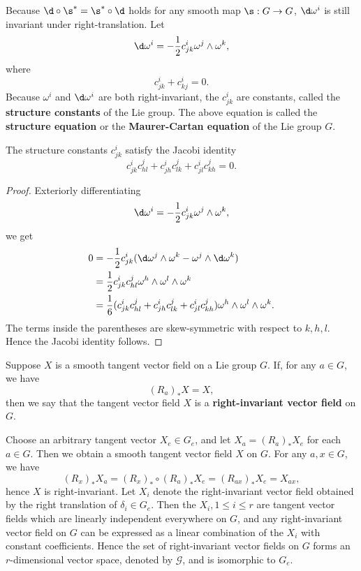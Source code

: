 \documentclass[11pt]{article}
\begin{document}
Because $\d \circ \s^* = \s^* \circ \d$ holds for any smooth map $\s : G \rightarrow G$, $\d\omega^i$ is still invariant under right-translation. Let $$\d\omega^i = -\frac{1}{2}c^i_{jk}\omega^j \wedge \omega^k,$$ where $$c^i_{jk} + c^i_{kj} = 0.$$ Because $\omega^i$ and $\d\omega^i$ are both right-invariant, the $c^i_{jk}$ are constants, called the \textbf{structure constants} of the Lie group. The above equation is called the \textbf{structure equation} or the \textbf{Maurer-Cartan equation} of the Lie group $G$. 

\begin{theorem}
    The structure constants $c^i_{jk}$ satisfy the Jacobi identity $$c^i_{jk}c^j_{hl} + c^i_{jh}c^j_{lk} + c^i_{jl}c^j_{kh} = 0.$$
\end{theorem}
\begin{proof}
    Exteriorly differentiating $$\d\omega^i = -\frac{1}{2}c^i_{jk}\omega^j \wedge \omega^k,$$ we get
    \begin{align*}
        0 &= -\frac{1}{2}c^i_{jk}(\d\omega^j \wedge \omega^k - \omega^j \wedge \d\omega^k) \\
        &= \frac{1}{2}c^i_{jk}c^j_{hl}\omega^h \wedge \omega^l \wedge \omega^k \\
        &= \frac{1}{6}(c^i_{jk}c^j_{hl} + c^i_{jh}c^j_{lk} + c^i_{jl}c^j_{kh})\omega^h \wedge \omega^l \wedge \omega^k.
    \end{align*}
    The terms inside the parentheses are skew-symmetric with respect to $k, h, l$. Hence the Jacobi identity follows.
\end{proof}

\begin{definition}
    Suppose $X$ is a smooth tangent vector field on a Lie group $G$. If, for any $a \in G$, we have $$(R_a)_*X = X,$$ then we say that the tangent vector field $X$ is a \textbf{right-invariant vector field} on $G$. 
\end{definition}

Choose an arbitrary tangent vector $X_e \in G_e$, and let $X_a = (R_a)_*X_e$ for each $a \in G$. Then we obtain a smooth tangent vector field $X$ on $G$. For any $a, x \in G$, we have $$(R_x)_*X_a = (R_x)_* \circ (R_a)_*X_e = (R_{ax})_*X_e = X_{ax},$$ hence $X$ is right-invariant. Let $X_i$ denote the right-invariant vector field obtained by the right translation of $\delta_i \in G_e$. Then the $X_i, 1 \le i \le r$ are tangent vector fields which are linearly independent everywhere on $G$, and any right-invariant vector field on $G$ can be expressed as a linear combination of the $X_i$ with constant coefficients. Hence the set of right-invariant vector fields on $G$ forms an $r$-dimensional vector space, denoted by $\mathcal{G}$, and is isomorphic to $G_e$. 
\end{document}
